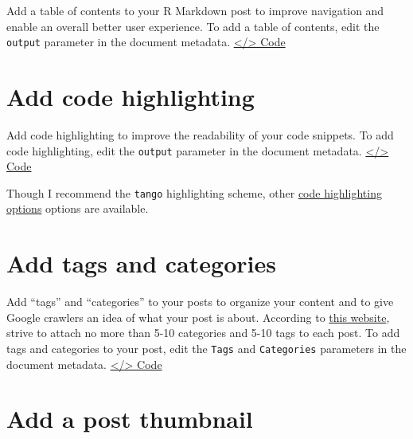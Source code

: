 \documentclass[
]{book}
\begin{document}
Add a table of contents to your R Markdown post to improve navigation and enable an overall better user experience. To add a table of contents, edit the \texttt{output} parameter in the document metadata. \href{https://github.com/dannymorris/r4sites-anatole-custom/blob/master/content/english/post/2021-04-22-sample-post-using-r-in-r-markdown/index.en.Rmd\#L6-L9}{\textless/\textgreater{} Code}

\hypertarget{add-code-highlighting}{%
\section{Add code highlighting}\label{add-code-highlighting}}

Add code highlighting to improve the readability of your code snippets. To add code highlighting, edit the \texttt{output} parameter in the document metadata. \href{https://github.com/dannymorris/r4sites-anatole-custom/blob/master/content/english/post/2021-04-22-sample-post-using-r-in-r-markdown/index.en.Rmd\#L6-L9}{\textless/\textgreater{} Code}

Though I recommend the \texttt{tango} highlighting scheme, other \href{https://bookdown.org/yihui/rmarkdown/html-document.html\#appearance-and-style}{code highlighting options} options are available.

\hypertarget{add-tags-and-categories}{%
\section{Add tags and categories}\label{add-tags-and-categories}}

Add ``tags'' and ``categories'' to your posts to organize your content and to give Google crawlers an idea of what your post is about. According to \href{https://databox.com/categories-vs-tags-for-seo}{this website}, strive to attach no more than 5-10 categories and 5-10 tags to each post. To add tags and categories to your post, edit the \texttt{Tags} and \texttt{Categories} parameters in the document metadata. \href{https://github.com/dannymorris/r4sites-anatole-custom/blob/master/content/english/post/2021-04-22-sample-post-using-r-in-r-markdown/index.en.Rmd\#L12-L13}{\textless/\textgreater{} Code}

\hypertarget{add-a-post-thumbnail}{%
\section{Add a post thumbnail}\label{add-a-post-thumbnail}}
\end{document}
